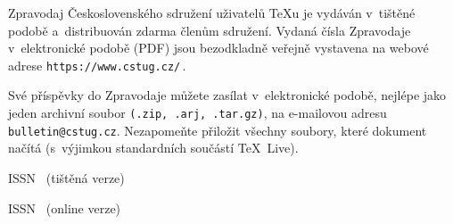 \documentclass[color]{csbulletin}[2021/03/19] %
\begin{document}
\vfill
\begin{small}
\noindent
Zpravodaj Československého sdružení uživatelů \TeX u je vydáván v~tištěné podobě
a~distribuován zdarma členům sdružení. Vydaná čísla Zpravodaje v~elektronické
podobě (PDF) jsou bezodkladně veřejně vystavena na webové adrese
\texttt{https://www.cstug.cz/}\,.

\medskip\noindent
Své příspěvky do Zpravodaje můžete zasílat v~elektronické podobě, nejlépe jako
jeden archivní soubor \texttt{(.zip, .arj, .tar.gz)}, na e-mailovou adresu
\texttt{bulletin@cstug.cz}.
Nezapomeňte přiložit všechny soubory, které dokument načítá (s~výjimkou
standardních součástí \TeX~Live).
\end{small}

\bigskip

\noindent ISSN \ISSN\ (ti\v{s}t\v{e}n\'{a} verze)

\noindent ISSN \XISSN\ (online verze)



\StartPage[61]



\tiraz

\begingroup
{}
\EnglishTOC
\endgroup
\end{document}
